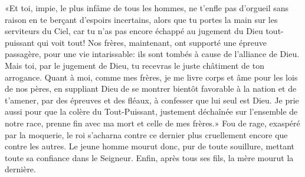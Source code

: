 «Et toi, impie, le plus infâme de tous les hommes,
	ne t’enfle pas d’orgueil sans raison en te berçant d’espoirs incertains,
	alors que tu portes la main sur les serviteurs du Ciel,
	car tu n’as pas encore échappé au jugement du Dieu tout-puissant qui voit tout!
Nos frères, maintenant, ont supporté une épreuve passagère, pour une vie intarissable:
	ils sont tombés à cause de l’alliance de Dieu.
Mais toi, par le jugement de Dieu, tu recevras le juste châtiment de ton arrogance.
Quant à moi, comme mes frères, je me livre corps et âme pour les lois de nos pères,
	en suppliant Dieu de se montrer bientôt favorable à la nation
	et de t’amener, par des épreuves et des fléaux, à confesser que lui seul est Dieu.
Je prie aussi pour que la colère du Tout-Puissant,
	justement déchaînée sur l’ensemble de notre race,
	prenne fin avec ma mort et celle de mes frères.»
Fou de rage, exaspéré par la moquerie,
	le roi s’acharna contre ce dernier plus cruellement encore que contre les autres.
Le jeune homme mourut donc, pur de toute souillure,
	mettant toute sa confiance dans le Seigneur.
Enfin, après tous ses fils, la mère mourut la dernière.
